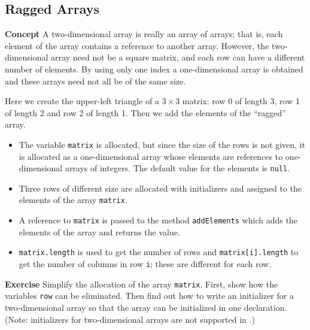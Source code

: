 \subsection{Ragged Arrays}\label{array.08}

\textbf{Concept} A two-dimensional array is really an array of arrays; that is, each  element of the array contains a reference to another array. However, the two-dimensional array need not be a square matrix, and each row can have a different number of elements. By using only one index a one-dimensional array is obtained and these arrays need not all be of the same size.


Here we create the upper-left triangle of a $3 \times 3$ matrix: row 0 of length 3, row 1 of length 2 and row 2 of length 1. Then we add the elements of the ``ragged'' array.
\begin{itemize}
\item The variable \texttt{matrix} is allocated, but since the size of the rows is not given, it is allocated as a one-dimensional array whose elements are references to one-dimensional arrays of integers. The default value for the elements is \texttt{null}.
\item Three rows of different size are allocated with initializers and assigned to the elements of the array \texttt{matrix}.
\item A reference to \texttt{matrix} is passed to the method \texttt{addElements} which adds the elements of the array and returns the value.
  \item \texttt{matrix.length} is used to get the number of rows and 
  \texttt{matrix[i].length} to get the number of columns in row \texttt{i}; these
  are different for each row.
\end{itemize}

\textbf{Exercise} Simplify the allocation of the array \texttt{matrix}. First, show how the variables \texttt{row} can be eliminated. Then find out how to write an initializer for a two-dimensional array so that the array can be initialized in one declaration. (Note: initializers for two-dimensional arrays are not supported in \jel{}.)
